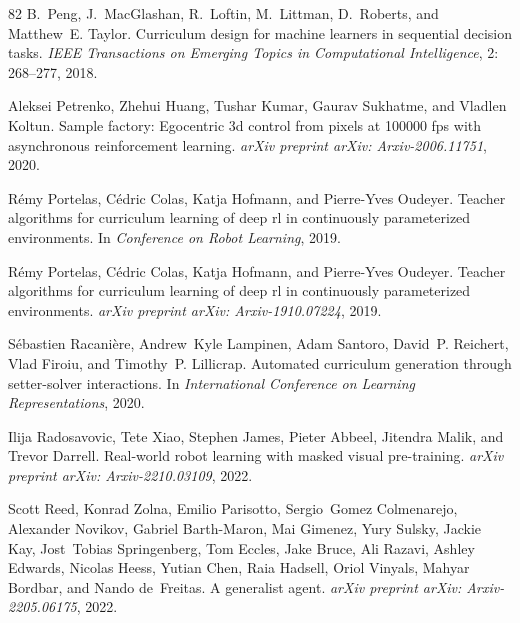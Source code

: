\documentclass{article}
\begin{document}
\begin{thebibliography}{82}
B.~Peng, J.~MacGlashan, R.~Loftin, M.~Littman, D.~Roberts, and Matthew~E. Taylor.
\newblock Curriculum design for machine learners in sequential decision tasks.
\newblock \emph{IEEE Transactions on Emerging Topics in Computational Intelligence}, 2: 268--277, 2018.

Aleksei Petrenko, Zhehui Huang, Tushar Kumar, Gaurav Sukhatme, and Vladlen Koltun.
\newblock Sample factory: Egocentric 3d control from pixels at 100000 fps with asynchronous reinforcement learning.
\newblock \emph{arXiv preprint arXiv: Arxiv-2006.11751}, 2020.

R{\'e}my Portelas, C{\'e}dric Colas, Katja Hofmann, and Pierre-Yves Oudeyer.
\newblock Teacher algorithms for curriculum learning of deep rl in continuously parameterized environments.
\newblock In \emph{Conference on Robot Learning}, 2019{}.

Rémy Portelas, Cédric Colas, Katja Hofmann, and Pierre-Yves Oudeyer.
\newblock Teacher algorithms for curriculum learning of deep rl in continuously parameterized environments.
\newblock \emph{arXiv preprint arXiv: Arxiv-1910.07224}, 2019{}.

S{\'e}bastien Racani{\`e}re, Andrew~Kyle Lampinen, Adam Santoro, David~P. Reichert, Vlad Firoiu, and Timothy~P. Lillicrap.
\newblock Automated curriculum generation through setter-solver interactions.
\newblock In \emph{International Conference on Learning Representations}, 2020.

Ilija Radosavovic, Tete Xiao, Stephen James, Pieter Abbeel, Jitendra Malik, and Trevor Darrell.
\newblock Real-world robot learning with masked visual pre-training.
\newblock \emph{arXiv preprint arXiv: Arxiv-2210.03109}, 2022.

Scott Reed, Konrad Zolna, Emilio Parisotto, Sergio~Gomez Colmenarejo, Alexander Novikov, Gabriel Barth-Maron, Mai Gimenez, Yury Sulsky, Jackie Kay, Jost~Tobias Springenberg, Tom Eccles, Jake Bruce, Ali Razavi, Ashley Edwards, Nicolas Heess, Yutian Chen, Raia Hadsell, Oriol Vinyals, Mahyar Bordbar, and Nando de~Freitas.
\newblock A generalist agent.
\newblock \emph{arXiv preprint arXiv: Arxiv-2205.06175}, 2022.


\end{thebibliography}
\end{document}
